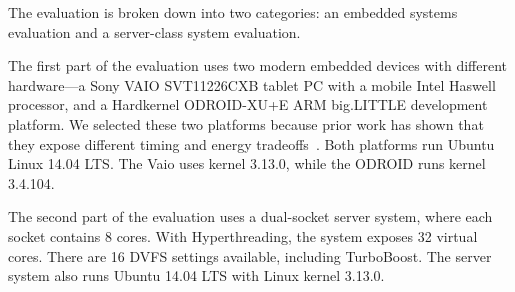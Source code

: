 The evaluation is broken down into two categories: an embedded systems evaluation and a server-class system evaluation.

The first part of the evaluation uses two modern embedded devices with different hardware---a Sony VAIO SVT11226CXB tablet PC with a mobile Intel Haswell processor, and a Hardkernel ODROID-XU+E ARM big.LITTLE development platform.
We selected these two platforms because prior work has shown that they expose different timing and energy tradeoffs~\cite{Imes2014}.
Both platforms run Ubuntu Linux 14.04 LTS.
The Vaio uses kernel 3.13.0, while the ODROID runs kernel 3.4.104.


The second part of the evaluation uses a dual-socket server system, where each socket contains 8 cores.
With Hyperthreading, the system exposes 32 virtual cores.
There are 16 DVFS settings available, including TurboBoost.
The server system also runs Ubuntu 14.04 LTS with Linux kernel 3.13.0.

